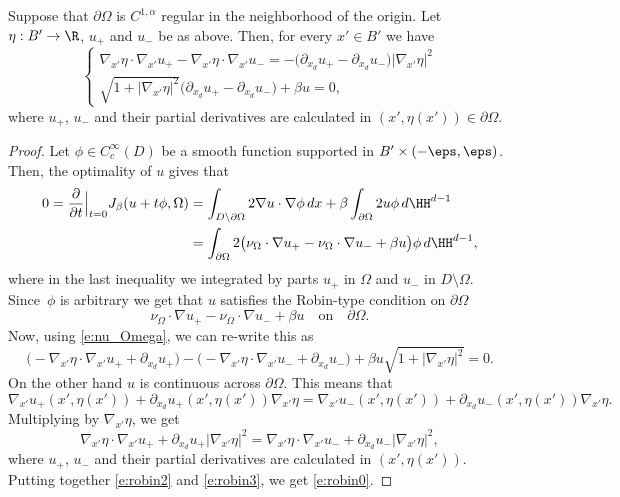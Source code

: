 \begin{lemma}\label{l:robin_condition}
Suppose that $\partial\Omega$ is $C^{1,\alpha}$ regular in the neighborhood of the origin. Let $\eta:B'\to\R$, $u_+$ and $u_-$ be as above. Then, for every $x'\in B'$ we have
\begin{equation}\label{e:robin0}
\begin{cases}
\nabla_{\!x'}\eta\cdot \nabla_{\!x'}u_+-\nabla_{\!x'}\eta\cdot \nabla_{\!x'}u_-=-\big(\partial_{x_d}u_+-\partial_{x_d}u_-\big)|\nabla_{\!x'}\eta|^2\\
\sqrt{1+|\nabla_{\!x'}\eta|^2}\big(\partial_{x_d}u_+-\partial_{x_d}u_-\big)+\beta u=0,
\end{cases}
\end{equation}
where $u_+$, $u_-$ and their partial derivatives are calculated in $(x',\eta(x'))\in \partial\Omega$.
\end{lemma}
\begin{proof}
Let $\phi\in C^{\infty}_c(D)$ be a smooth function supported in $B'\times(-\eps,\eps)$.
Then, the optimality of $u$ gives that
\begin{align*}
0=\frac{\partial}{\partial t}\Big\vert_{t=0}J_\beta(u+t\phi,\Omega)&=\int_{D\setminus\partial\Omega}2\nabla u\cdot\nabla \phi\,dx+\beta\int_{\partial\Omega}2u\phi\,d\HH^{d-1}\\
&=\int_{\partial\Omega}2\big(\nu_\Omega\cdot\nabla u_+-\nu_\Omega\cdot\nabla u_-+\beta u\big)\phi\,d\HH^{d-1},
\end{align*}
where in the last inequality we integrated by parts $u_+$ in $\Omega$ and $u_-$ in $D\setminus\Omega$.
Since~$\phi$ is arbitrary we get that $u$ satisfies the Robin-type condition on $\partial\Omega$
\begin{equation}%
\nu_\Omega\cdot\nabla u_+-\nu_\Omega\cdot\nabla u_-+\beta u\quad\text{on}\quad \partial\Omega.
\end{equation}
Now, using \eqref{e:nu_Omega}, we can re-write this as
\begin{equation}\label{e:robin2}
\big(-\nabla_{\!x'}\eta\cdot\nabla_{\!x'}u_++\partial_{x_d}u_+\big)-\big(-\nabla_{\!x'}\eta\cdot\nabla_{\!x'}u_-+\partial_{x_d}u_-\big)+\beta u \sqrt{1+|\nabla_{\!x'}\eta|^2}=0.
\end{equation}
On the other hand $u$ is continuous across $\partial\Omega$. This means that
\[\nabla_{\!x'}u_+(x',\eta(x'))+\partial_{x_d}u_+(x',\eta(x'))\nabla_{\!x'}\eta=\nabla_{\!x'}u_-(x',\eta(x'))+\partial_{x_d}u_-(x',\eta(x'))\nabla_{\!x'}\eta.\]
Multiplying by $\nabla_{\!x'}\eta$, we get
\begin{equation}\label{e:robin3}
\nabla_{\!x'}\eta\cdot \nabla_{\!x'}u_++\partial_{x_d}u_+|\nabla_{\!x'}\eta|^2=\nabla_{\!x'}\eta\cdot \nabla_{\!x'}u_-+\partial_{x_d}u_-|\nabla_{\!x'}\eta|^2,
\end{equation}
where $u_+$, $u_-$ and their partial derivatives are calculated in $(x',\eta(x'))$. Putting together \eqref{e:robin2} and \eqref{e:robin3}, we get \eqref{e:robin0}.
\end{proof}

